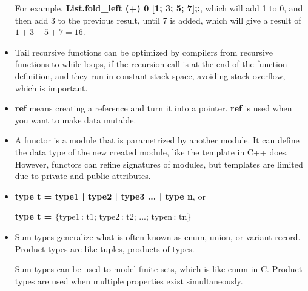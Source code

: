 \documentclass[12pt, a4paper]{article}
\begin{document}
\begin{itemize}
          For example, \textbf{List.fold\_left (+) 0 [1; 3; 5; 7];;}, which will add 1 to 0, and then add 3 to the previous result, 
          until 7 is added, which will give a result of $1+3+5+7 = 16$.

    \item Tail recursive functions can be optimized by compilers from recursive functions to while loops, 
          if the recursion call is at the end of the function definition, 
          and they run in constant stack space, avoiding stack overflow, which is important.

    \item \textbf{ref} means creating a reference and turn it into a pointer. \textbf{ref} is used when you want to make data mutable.
    
    \item A functor is a module that is parametrized by another module. It can define the data type of the new created module, 
          like the template in C++ does. However, functors can refine signatures of modules, but templates are limited due to private and public attributes.

    \item \textbf{type t = type1 | type2 | type3 ... | type n}, or
        
          \textbf{type t = $\{\text{type1}\, :\, \text{t1};\, \text{type2}\, :\, \text{t2};\, ...;\, \text{typen}\, :\, \text{tn}\}$}

    \item Sum types generalize what is often known as enum, union, or variant record. Product types are like tuples, products of types.
    
          Sum types can be used to model finite sets, which is like enum in C. Product types are used when multiple properties exist simultaneously.

\end{itemize}
\end{document}
